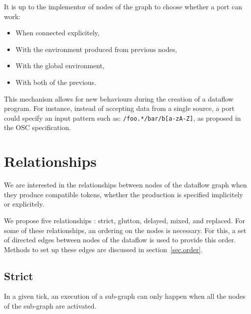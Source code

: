 \documentclass{article}
\begin{document}
It is up to the implementor of nodes of the graph to choose whether a port can work: 
\begin{itemize}
  \item When connected explicitely,
  \item With the environment produced from previous nodes,
  \item With the global environment,
  \item With both of the previous.
\end{itemize} 

This mechanism allows for new behaviours during the creation of a dataflow program.
For instance, instead of accepting data from a single source, a port could specify an input pattern such as: \lstinline|/foo.*/bar/b[a-zA-Z]|, as proposed in the OSC specification.
	
	
    
\section{Relationships}
\label{sec.relationships}
We are interested in the relationships between nodes of the dataflow graph when they produce compatible tokens, whether the production is specified implicitely or explicitely.
    
We propose five relationships : strict, glutton, delayed, mixed, and replaced. 
For some of these relationships, an ordering on the nodes is necessary. 
For this, a set of directed edges between nodes of the dataflow is used to provide this order.
Methods to set up these edges are discussed in section~\ref{sec.order}.
    
\subsection{Strict}
In a given tick, an execution of a sub-graph can only happen when all the nodes of the sub-graph are activated.
    
\end{document}
